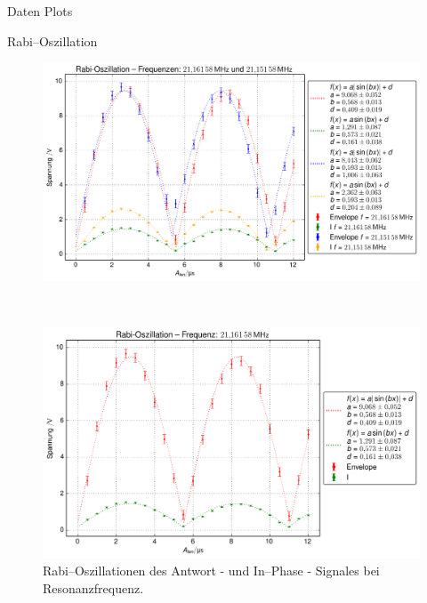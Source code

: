 \begin{appendix}
\begin{chapter}{Daten Plots}
    \newpage
    \begin{section}{Rabi--Oszillation}
      \label{chpAnhangRabi}
      \begin{figure}[htb]
        \centering
        \begin{minipage}{\textwidth}
          \centering
          \includegraphics[width=\textwidth]{Figures/Rabi_freq12.png}
          \caption{Rabi--Oszillationen des Antwort - und In--Phase - Signales
            beider Frequenzen.}
          \label{AnhangfigRabi12}
        \end{minipage}\\
        \begin{minipage}{.48\textwidth}
          \centering
          \includegraphics[width=\textwidth]{Figures/Rabi_freq1.png}
          \caption{Rabi--Oszillationen des Antwort - und In--Phase - Signales
            bei Resonanzfrequenz.}
          \label{AnhangfigRabi1}
        \end{minipage}\quad

\end{figure}
\end{section}
\end{chapter}
\end{appendix}
